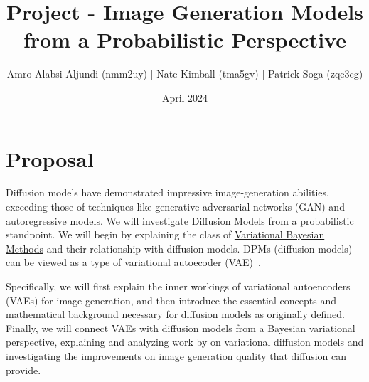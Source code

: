 \documentclass{article}
\title{Project - Image Generation Models from a Probabilistic Perspective}
\author{Amro Alabsi Aljundi (nmm2uy) | Nate Kimball (tma5gv) | Patrick Soga (zqe3cg)}
\date{April 2024}
\begin{document}
\newcommand{\pt}{p_\theta}
\newcommand{\qp}{q_\phi}
\newcommand{\E}{\mathbb{E}}
\newcommand{\Eqp}{\E_{\qp}}
\newcommand{\Eql}{\E_{\qp(z|x^{(i)})}}
\newcommand{\kl}{D_{KL}}
\newcommand{\loss}{\mathcal{L}(\theta,\phi;x^{(i)})}
\newcommand{\lossA}{\tilde{\mathcal{L}}^A(\theta,\phi;x^{(i)})}
\newcommand{\lossB}{\tilde{\mathcal{L}}^B(\theta,\phi;x^{(i)})}
\newcommand{\bt}{\beta_{t}}
\newcommand{\at}{\alpha_t}
\newcommand{\aht}{\bar{\alpha}_t}
\newcommand{\N}{\mathcal{N}}
\newcommand{\amro}[1]{({\color{blue} amro: #1})}
\DeclarePairedDelimiter{\norm}{\lVert}{\rVert}

\maketitle

\section{Proposal}

Diffusion models have demonstrated impressive image-generation abilities, exceeding those of techniques like generative adversarial networks (GAN) and autoregressive models. 
We will investigate \href{https://en.wikipedia.org/wiki/Diffusion_model}{Diffusion Models} from a probabilistic standpoint. We will begin by explaining the class of \href{https://en.wikipedia.org/wiki/Variational_Bayesian_methods}{Variational Bayesian Methods} and their relationship with diffusion models.
DPMs (diffusion models) can be viewed as a type of \href{https://en.wikipedia.org/wiki/Variational_autoencoder}{variational autoecoder (VAE)}~\citep{Kingma2014, pmlr-v32-rezende14}. 

Specifically, we will first explain the inner workings of variational autoencoders (VAEs) \citep{Kingma2014} for image generation, and then introduce the essential concepts and mathematical background necessary for diffusion models \citep{ho-denoising} as originally defined. Finally, we will connect VAEs with diffusion models from a Bayesian variational perspective, explaining and analyzing work by \cite{kingma-vdm} on variational diffusion models and investigating the improvements on image generation quality that diffusion can provide.
\end{document}
